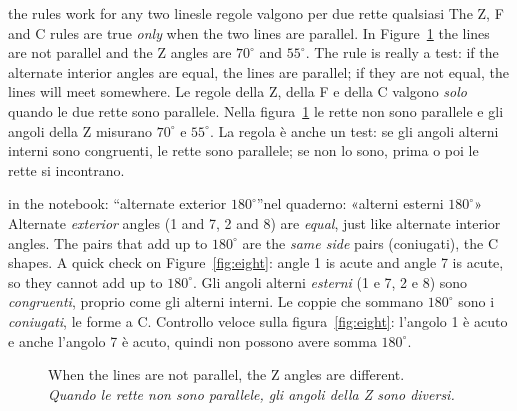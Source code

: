 \documentclass[10pt,a4paper,oneside]{book}
\newcommand{\bicap}[2]{\caption{#1\\{\color{itgreen}\itshape #2}}}
\begin{document}
\begin{trap}{the rules work for any two lines}{le regole valgono per due rette qualsiasi}
The Z, F and C rules are true \emph{only} when the two lines are parallel. In Figure~\ref{fig:notparallel} the lines are not parallel and the Z angles are $70^\circ$ and $55^\circ$. The rule is really a test: if the alternate interior angles are equal, the lines are parallel; if they are not equal, the lines will meet somewhere.
\tcblower
Le regole della Z, della F e della C valgono \emph{solo} quando le due rette sono parallele. Nella figura~\ref{fig:notparallel} le rette non sono parallele e gli angoli della Z misurano $70^\circ$ e $55^\circ$. La regola è anche un test: se gli angoli alterni interni sono congruenti, le rette sono parallele; se non lo sono, prima o poi le rette si incontrano.
\end{trap}

\begin{trap}{in the notebook: ``alternate exterior $180^\circ$''}{nel quaderno: «alterni esterni $180^\circ$»}
Alternate \emph{exterior} angles (1 and 7, 2 and 8) are \emph{equal}, just like alternate interior angles. The pairs that add up to $180^\circ$ are the \emph{same side} pairs (coniugati), the C shapes. A quick check on Figure~\ref{fig:eight}: angle 1 is acute and angle 7 is acute, so they cannot add up to $180^\circ$.
\tcblower
Gli angoli alterni \emph{esterni} (1 e 7, 2 e 8) sono \emph{congruenti}, proprio come gli alterni interni. Le coppie che sommano $180^\circ$ sono i \emph{coniugati}, le forme a C. Controllo veloce sulla figura~\ref{fig:eight}: l'angolo 1 è acuto e anche l'angolo 7 è acuto, quindi non possono avere somma $180^\circ$.
\end{trap}

\begin{figure}[htbp]
\centering
\bicap{When the lines are not parallel, the Z angles are different.}%
      {Quando le rette non sono parallele, gli angoli della Z sono diversi.}
\label{fig:notparallel}
\end{figure}
\end{document}
